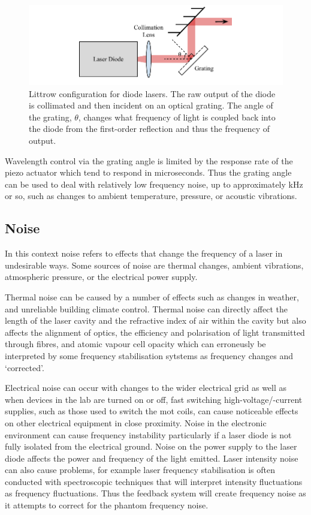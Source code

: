 \begin{figure}
\includegraphics{part1/Figs/LittrowConfiguration.pdf}
\caption[Littrow configuration diode laser.]{Littrow configuration for diode lasers. The raw output of the diode is collimated and then incident on an optical grating. The angle of the grating, $\theta$, changes what frequency of light is coupled back into the diode from the first-order reflection and thus the frequency of output.}
\label{figure:littrow}
\end{figure}

Wavelength control via the grating angle is limited by the response rate of the piezo actuator which tend to respond in microseconds.
Thus the grating angle can be used to deal with relatively low frequency noise, up to approximately \unit[1]{kHz} or so, such as changes to ambient temperature, pressure, or acoustic vibrations.

\subsection{Noise}
In this context noise refers to effects that change the frequency of a laser in undesirable ways.
Some sources of noise are thermal changes, ambient vibrations, atmospheric pressure, or the electrical power supply.

Thermal noise can be caused by a number of effects such as changes in weather, and unreliable building climate control.
Thermal noise can directly affect the length of the laser cavity and the refractive index of air within the cavity but also affects the alignment of optics, the efficiency and polarisation of light transmitted through fibres, and atomic vapour cell opacity which can erroneusly be interpreted by some frequency stabilisation sytstems as frequency changes and `corrected'.

Electrical noise can occur with changes to the wider electrical grid as well as when devices in the lab are turned on or off, fast switching high-voltage/-current supplies, such as those used to switch the \gls{mot} coils, can cause noticeable effects on other electrical equipment in close proximity.
Noise in the electronic environment can cause frequency instability particularly if a laser diode is not fully isolated from the electrical ground.
Noise on the power supply to the laser diode affects the power and frequency of the light emitted.
Laser intensity noise can also cause problems, for example laser frequency stabilisation is often conducted with spectroscopic techniques that will interpret intensity fluctuations as frequency fluctuations. Thus the feedback system will create frequency noise as it attempts to correct for the phantom frequency noise.

